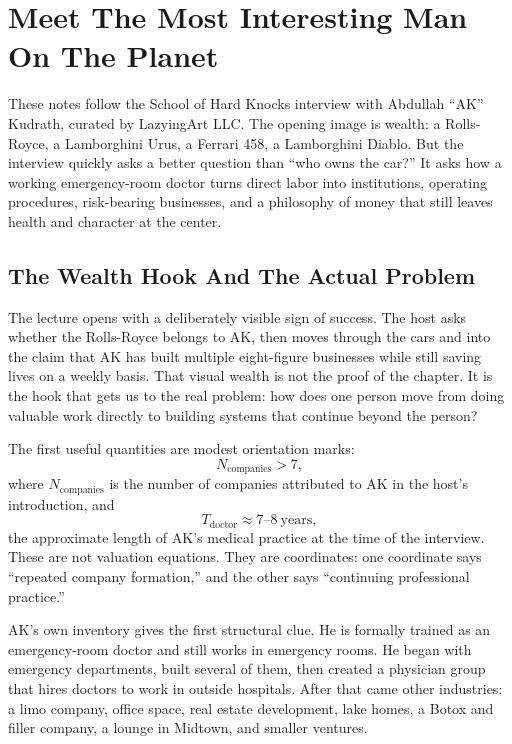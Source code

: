 \chapter{Meet The Most Interesting Man On The Planet}

These notes follow the School of Hard Knocks interview with Abdullah ``AK'' Kudrath, curated by LazyingArt LLC. The opening image is wealth: a Rolls-Royce, a Lamborghini Urus, a Ferrari 458, a Lamborghini Diablo. But the interview quickly asks a better question than ``who owns the car?'' It asks how a working emergency-room doctor turns direct labor into institutions, operating procedures, risk-bearing businesses, and a philosophy of money that still leaves health and character at the center.

\section{The Wealth Hook And The Actual Problem}

The lecture opens with a deliberately visible sign of success. The host asks whether the Rolls-Royce belongs to AK, then moves through the cars and into the claim that AK has built multiple eight-figure businesses while still saving lives on a weekly basis. That visual wealth is not the proof of the chapter. It is the hook that gets us to the real problem: how does one person move from doing valuable work directly to building systems that continue beyond the person?

The first useful quantities are modest orientation marks:
\begin{equation}
N_{\mathrm{companies}} > 7,
\end{equation}
where \(N_{\mathrm{companies}}\) is the number of companies attributed to AK in the host's introduction, and
\begin{equation}
T_{\mathrm{doctor}} \approx 7\text{--}8 \ \mathrm{years},
\end{equation}
the approximate length of AK's medical practice at the time of the interview. These are not valuation equations. They are coordinates: one coordinate says ``repeated company formation,'' and the other says ``continuing professional practice.''

AK's own inventory gives the first structural clue. He is formally trained as an emergency-room doctor and still works in emergency rooms. He began with emergency departments, built several of them, then created a physician group that hires doctors to work in outside hospitals. After that came other industries: a limo company, office space, real estate development, lake homes, a Botox and filler company, a lounge in Midtown, and smaller ventures.

